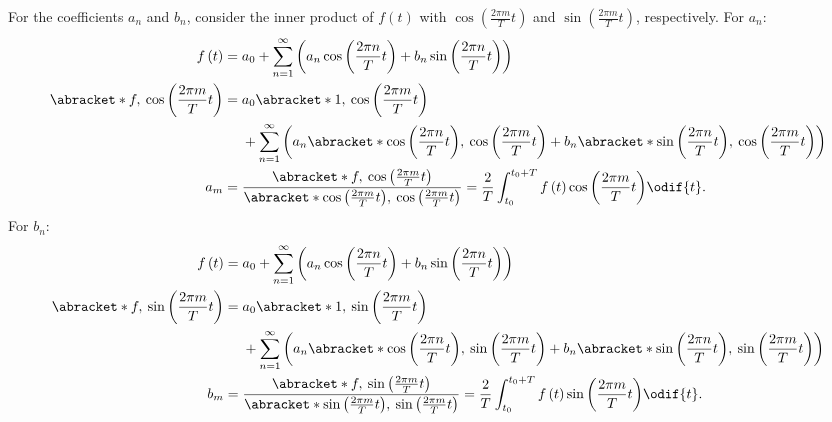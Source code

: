 \documentclass{article}
\begin{document}
For the coefficients \(a_n\) and \(b_n\), consider the inner product of
\(f\left( t \right)\) with \(\cos{\left( \frac{2\pi m}{T} t \right)}\)
and \(\sin{\left( \frac{2\pi m}{T} t \right)}\), respectively. For \(a_n\):
\begin{align*}
    f\left( t \right)                                        & = a_0 + \sum_{n=1}^{\infty} \left( a_n \cos{\left( \frac{2\pi n}{T} t \right)} + b_n \sin{\left( \frac{2\pi n}{T} t \right)} \right)                                                                                                                                     \\
    \abracket*{f,\: \cos{\left( \frac{2\pi m}{T} t \right)}} & =
    \begin{aligned}[t]
         & a_0 \abracket*{1,\: \cos{\left( \frac{2\pi m}{T} t \right)}}                                                                                                                                                                                 \\
         & + \sum_{n=1}^{\infty} \left( a_n \abracket*{\cos{\left( \frac{2\pi n}{T} t \right)},\: \cos{\left( \frac{2\pi m}{T} t \right)}} + b_n \abracket*{\sin{\left( \frac{2\pi n}{T} t \right)},\: \cos{\left( \frac{2\pi m}{T} t \right)}} \right)
    \end{aligned}
    \\
    a_m                                                      & = \frac{\abracket*{f,\: \cos{\left( \frac{2\pi m}{T} t \right)}}}{\abracket*{\cos{\left( \frac{2\pi m}{T} t \right)},\: \cos{\left( \frac{2\pi m}{T} t \right)}}} = \frac{2}{T} \int_{t_0}^{t_0 + T} f\left( t \right) \cos{\left( \frac{2\pi m}{T} t \right)} \odif{t}.
\end{align*}
For \(b_n\):
\begin{align*}
    f\left( t \right)                                        & = a_0 + \sum_{n=1}^{\infty} \left( a_n \cos{\left( \frac{2\pi n}{T} t \right)} + b_n \sin{\left( \frac{2\pi n}{T} t \right)} \right)                                                                                                                                     \\
    \abracket*{f,\: \sin{\left( \frac{2\pi m}{T} t \right)}} & =
    \begin{aligned}[t]
         & a_0 \abracket*{1,\: \sin{\left( \frac{2\pi m}{T} t \right)}}                                                                                                                                                                                 \\
         & + \sum_{n=1}^{\infty} \left( a_n \abracket*{\cos{\left( \frac{2\pi n}{T} t \right)},\: \sin{\left( \frac{2\pi m}{T} t \right)}} + b_n \abracket*{\sin{\left( \frac{2\pi n}{T} t \right)},\: \sin{\left( \frac{2\pi m}{T} t \right)}} \right)
    \end{aligned}
    \\
    b_m                                                      & = \frac{\abracket*{f,\: \sin{\left( \frac{2\pi m}{T} t \right)}}}{\abracket*{\sin{\left( \frac{2\pi m}{T} t \right)},\: \sin{\left( \frac{2\pi m}{T} t \right)}}} = \frac{2}{T} \int_{t_0}^{t_0 + T} f\left( t \right) \sin{\left( \frac{2\pi m}{T} t \right)} \odif{t}.
\end{align*}
\end{document}

